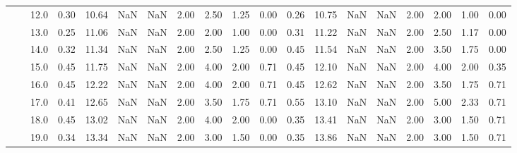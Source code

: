\begin{tabular}{lllrrrrrrrrrrrrrrrr}
       &     & 12.0 &      0.30 &      10.64 &               NaN &                NaN & 2.00 &   2.50 &             1.25 &                         0.00 &      0.26 &      10.75 &               NaN &                NaN & 2.00 &   2.00 &             1.00 &                         0.00 \\
       &     & 13.0 &      0.25 &      11.06 &               NaN &                NaN & 2.00 &   2.00 &             1.00 &                         0.00 &      0.31 &      11.22 &               NaN &                NaN & 2.00 &   2.50 &             1.17 &                         0.00 \\
       &     & 14.0 &      0.32 &      11.34 &               NaN &                NaN & 2.00 &   2.50 &             1.25 &                         0.00 &      0.45 &      11.54 &               NaN &                NaN & 2.00 &   3.50 &             1.75 &                         0.00 \\
       &     & 15.0 &      0.45 &      11.75 &               NaN &                NaN & 2.00 &   4.00 &             2.00 &                         0.71 &      0.45 &      12.10 &               NaN &                NaN & 2.00 &   4.00 &             2.00 &                         0.35 \\
       &     & 16.0 &      0.45 &      12.22 &               NaN &                NaN & 2.00 &   4.00 &             2.00 &                         0.71 &      0.45 &      12.62 &               NaN &                NaN & 2.00 &   3.50 &             1.75 &                         0.71 \\
       &     & 17.0 &      0.41 &      12.65 &               NaN &                NaN & 2.00 &   3.50 &             1.75 &                         0.71 &      0.55 &      13.10 &               NaN &                NaN & 2.00 &   5.00 &             2.33 &                         0.71 \\
       &     & 18.0 &      0.45 &      13.02 &               NaN &                NaN & 2.00 &   4.00 &             2.00 &                         0.00 &      0.35 &      13.41 &               NaN &                NaN & 2.00 &   3.00 &             1.50 &                         0.71 \\
       &     & 19.0 &      0.34 &      13.34 &               NaN &                NaN & 2.00 &   3.00 &             1.50 &                         0.00 &      0.35 &      13.86 &               NaN &                NaN & 2.00 &   3.00 &             1.50 &                         0.71 \\

\end{tabular}
